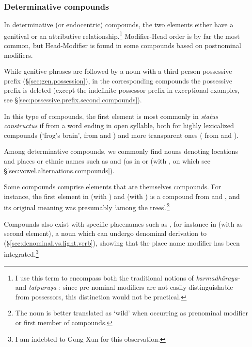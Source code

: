\subsubsection{Determinative compounds} \label{sec:determinative.n.n}
In determinative (or endocentric) compounds, the two elements either have a genitival or an attributive relationship.\footnote{I use this term to encompass both the traditional notions of \textit{karmadhāraya-} and \hbox{\textit{tatpuruṣa-}:} since pre-nominal modifiers are not easily distinguishable from possessors, this distinction would not be practical. } Modifier-Head order is by far the most common, but Head-Modifier is found in some compounds based on postnominal modifiers.

While genitive phrases are followed by a noun with a third person possessive prefix (§\ref{sec:gen.possession}), in the corresponding compounds the possessive prefix is deleted (except the indefinite possessor prefix in exceptional examples, see §\ref{sec:possessive.prefix.second.compounds}).

In this type of compounds, the first element is most commonly in \textit{status constructus} if from a word ending in open syllable, both for highly lexicalized compounds  (`frog's brain', from  and ) and more transparent ones ( from   and ). 

Among determinative compounds, we commonly find nouns denoting locations and places or ethnic names such as  and  (as in  or (with , on which see §\ref{sec:vowel.alternations.compounds}). 

Some compounds comprise elements that are themselves compounds. For instance, the first element  in  (with ) and  (with )
is a compound from  and , and its original meaning was presumably `among the trees'.\footnote{The noun   is better translated as `wild' when occurring as prenominal modifier or first member of compounds.}

Compounds also exist with specific placenames such as , for instance in  (with   as second element), a noun which can undergo denominal derivation to   (§\ref{sec:denominal.vs.light.verb}), showing that the place name modifier has been integrated.\footnote{I am indebted to Gong Xun for this observation. }

